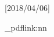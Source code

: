 %
%
%
%
%
%
%
%
%

\usepackage{pdfbase,ocgbase}[2018/04/06]
\usepackage{xparse}
\usepackage{calc,linegoal}
\usepackage{xcolor}

\makeatletter


\let\Hy@setpdfborderOrig\Hy@setpdfborder
\def\Hy@setpdfborder{\ocgbase@insert@oc\Hy@setpdfborderOrig}%


\ExplSyntaxOn
\let\XC@pdfLink\pbs_pdflink:nn
\ExplSyntaxOff

\newsavebox{\XC@tipText}

\newlength{\XC@hGoal}
\newlength{\XC@hShift}
\newlength{\XC@hOffset} \setlength\XC@hOffset{0pt}
\newlength{\XC@vOffset} \setlength\XC@vOffset{0.5ex}


